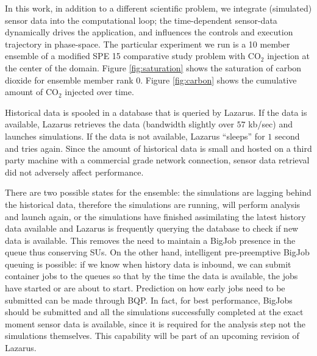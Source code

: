 \documentclass{acm_proc_article-sp}
\newcommand{\jhanote}[1]{ {\textcolor{red} { ***Jha: #1 }}}
\newcommand{\jhanote}[1]{}
\begin{document}
In this work, in addition to a different scientific problem, we
integrate (simulated) sensor data into the computational loop; the
time-dependent sensor-data dynamically drives the application, and
influences the controls and execution trajectory in phase-space. The
particular experiment we run is a 10 member ensemble of a modified SPE 15 comparative study problem
with CO$_2$ injection at the center of the domain. Figure \ref{fig:saturation}
shows the saturation of carbon dioxide for ensemble member rank $0$. Figure \ref{fig:carbon}
shows the cumulative amount of CO$_2$ injected over time.

Historical data is spooled in a database that is queried by Lazarus. If the data is available,
Lazarus retrieves the data (bandwidth slightly over $57$ kb/sec) and launches
simulations. If the data is not available, Lazarus ``sleeps'' for $1$ second
and tries again. Since the amount of historical data is small and hosted
on a third party machine with a commercial grade network connection, sensor
data retrieval did not adversely affect performance.

There are two possible states for the ensemble: the simulations are lagging behind
the historical data, therefore the simulations are running, will perform analysis
and launch again, or the simulations have finished assimilating the latest history
data available and Lazarus is frequently querying the database to check if new data
is available. This removes the need to maintain a BigJob presence in the queue
thus conserving SUs. On the other hand, intelligent pre-preemptive BigJob queuing is possible:
if we know when history data is inbound, we can submit container jobs to the queues
so that by the time the data is available, the jobs have started or are about to start. Prediction
on how early jobs need to be submitted can be made through BQP. In fact, for best performance,
BigJobs should be submitted and all the simulations successfully completed at the exact moment
sensor data is available, since it is required for the analysis step not the simulations
themselves. This capability will be part of an upcoming revision of Lazarus.

\end{document}
